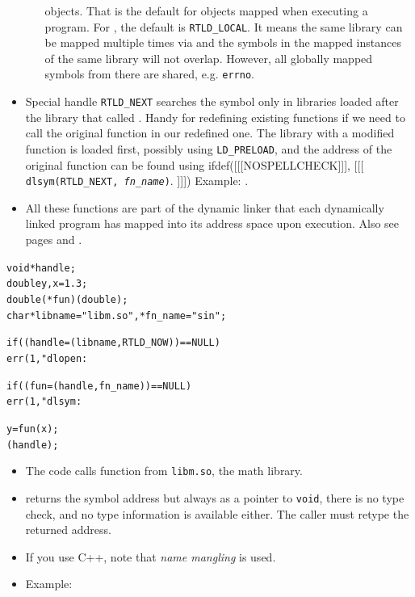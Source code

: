 \begin{itemize}
\begin{itemize}
    objects.  That is the default for objects mapped when executing a program.
    For , the default is \texttt{RTLD\_LOCAL}.  It means
    the same library can be mapped multiple times via  and the
    symbols in the mapped instances of the same library will not overlap.
    However, all globally mapped symbols from there are shared, e.g.
    \texttt{errno}.
    \end{itemize}
\item \label{RTLD_NEXT} Special handle \texttt{RTLD\_NEXT} searches the symbol
only in libraries loaded after the library that called .  Handy for
redefining existing functions if we need to call the original function in our
redefined one.  The library with a modified function is loaded first, possibly
using \texttt{LD\_PRELOAD}, and the address of the original function can be
found using
ifdef([[[NOSPELLCHECK]]], [[[
\texttt{dlsym(RTLD\_NEXT, \emph{fn\_name})}.
]]])
Example: .
\item  All these functions are part of the dynamic linker that each dynamically
linked program has mapped into its address space upon execution.  Also see pages
\pageref{RUNTIMELINKER} and \pageref{EXEC}.
\end{itemize}


\begin{slide}
\begin{alltt}
void *handle;
double y, x = 1.3;
double (*fun)(double); 
char *libname = "libm.so", *fn\_name = "sin";

if ((handle = (libname, RTLD\_NOW)) == NULL)
        err(1, "dlopen: %

if ((fun = (handle, fn\_name)) == NULL)
        err(1, "dlsym: %

y = fun(x);
(handle);
\end{alltt}
\end{slide}

\begin{itemize}
\item The code calls function  from \texttt{libm.so}, the math
library.
\item {} returns the symbol address but always as a pointer to
\texttt{void}, there is no type check, and no type information is available
either.  The caller must retype the returned address.
\item If you use C++, note that \emph{name mangling} is used.
\item Example: 
\end{itemize}

\endinput
